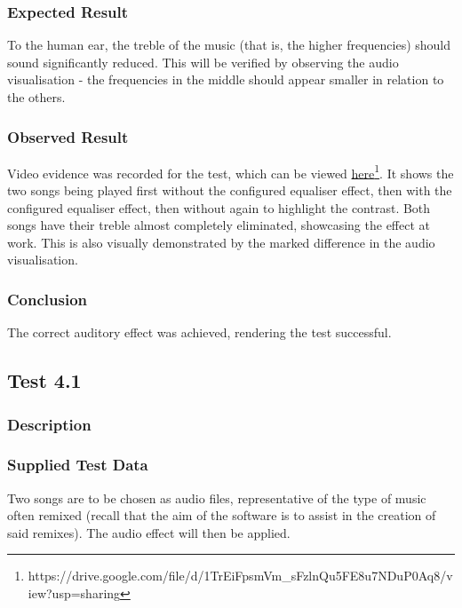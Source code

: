 \subsubsection{Expected Result}
To the human ear, the treble of the music (that is, the higher frequencies) should sound significantly reduced. This will be verified by observing the audio visualisation - the frequencies in the middle should appear smaller in relation to the others.

\subsubsection{Observed Result}
\label{sec:evidence3.2}
Video evidence was recorded for the test, which can be viewed \href{https://drive.google.com/file/d/1TrEiFpsmVm_sFzlnQu5FE8u7NDuP0Aq8/view?usp=sharing}{here}\footnote{
	https://drive.google.com/file/d/1TrEiFpsmVm\_sFzlnQu5FE8u7NDuP0Aq8/view?usp=sharing
}. It shows the two songs being played first without the configured equaliser effect, then with the configured equaliser effect, then without again to highlight the contrast. Both songs have their treble almost completely eliminated, showcasing the effect at work. This is also visually demonstrated by the marked difference in the audio visualisation.

\subsubsection{Conclusion}
The correct auditory effect was achieved, rendering the test successful. 


\pagebreak
\subsection{Test 4.1}
\subsubsection{Description}
\paragraph{}
{
	\centering
}

\subsubsection{Supplied Test Data}
Two songs are to be chosen as audio files, representative of the type of music often remixed (recall that the aim of the software is to assist in the creation of said remixes). The audio effect will then be applied.

